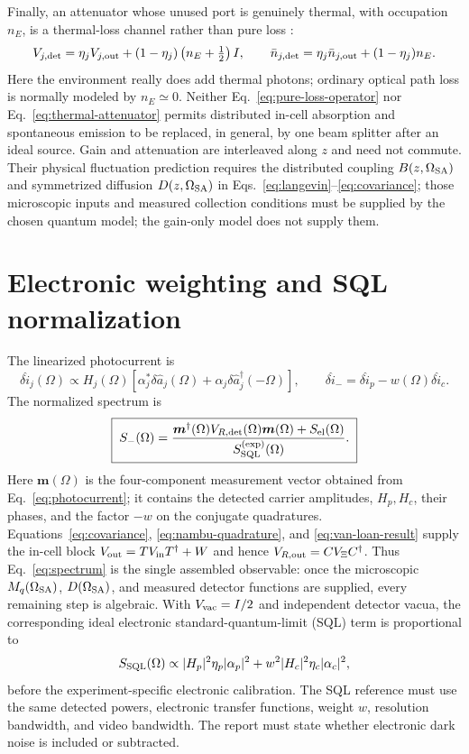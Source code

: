 \documentclass[11pt,a4paper]{article}
\begin{document}
Finally, an attenuator whose unused port is genuinely thermal, with occupation
$n_E$, is a thermal-loss channel rather than pure loss \cite{Lami2020,Xiang2017}:
\begin{equation}
 V_{j,{\rm det}}=\eta_j V_{j,{\rm out}}
 +(1-\eta_j)\left(n_E+\tfrac12\right)I,
 \qquad
 \bar n_{j,{\rm det}}=\eta_j\bar n_{j,{\rm out}}+(1-\eta_j)n_E .
 \label{eq:thermal-attenuator}
\end{equation}
Here the environment really does add thermal photons; ordinary optical path
loss is normally modeled by $n_E\simeq0$.  Neither Eq.~\eqref{eq:pure-loss-operator}
nor Eq.~\eqref{eq:thermal-attenuator} permits distributed in-cell absorption and
spontaneous emission to be replaced, in general, by one beam splitter after an
ideal source.  Gain and attenuation are interleaved along $z$ and need not
commute.  Their physical fluctuation prediction requires the distributed
coupling $B(z,\Omega_{\rm SA})$ and symmetrized diffusion
$D(z,\Omega_{\rm SA})$ in Eqs.~\eqref{eq:langevin}--\eqref{eq:covariance}; those
microscopic inputs and measured collection conditions must be supplied by the chosen quantum model; the gain-only model does not supply them.

\section{Electronic weighting and SQL normalization}

The linearized photocurrent is
\begin{equation}
\delta\hat i_j(\Omega)\propto H_j(\Omega)
\left[\alpha_j^*\delta\hat a_j(\Omega)
+\alpha_j\delta\hat a_j^\dagger(-\Omega)\right],
\qquad
\delta\hat i_-=\delta\hat i_p-w(\Omega)\delta\hat i_c .
\label{eq:photocurrent}
\end{equation}
The normalized spectrum is
\begin{equation}
\boxed{\;
S_-(\Omega)=
\frac{\bm m^\dagger(\Omega)V_{R,\rm det}(\Omega)\bm m(\Omega)
+S_{\rm el}(\Omega)}
{S_{\rm SQL}^{(\rm exp)}(\Omega)} .\;}
\label{eq:spectrum}
\end{equation}
Here $\bm m(\Omega)$ is the four-component measurement vector obtained from
Eq.~\eqref{eq:photocurrent}; it contains the detected carrier amplitudes,
$H_p,H_c$, their phases, and the factor $-w$ on the conjugate quadratures.
Equations~\eqref{eq:covariance}, \eqref{eq:nambu-quadrature}, and
\eqref{eq:van-loan-result} supply the in-cell block
$V_{\rm out}=T V_{\rm in}T^\dagger+W$ and hence
$V_{R,\rm out}=CV_\Xi C^\dagger$. Thus Eq.~\eqref{eq:spectrum} is the single
assembled observable: once the microscopic
$M_q(\Omega_{\rm SA})$, $D(\Omega_{\rm SA})$, and measured detector functions
are supplied, every remaining step is algebraic.
With $V_{\rm vac}=I/2$ and independent detector vacua, the corresponding
ideal electronic standard-quantum-limit (SQL) term is proportional to
\[
S_{\rm SQL}(\Omega)\propto
|H_p|^2\eta_p|\alpha_p|^2+
w^2|H_c|^2\eta_c|\alpha_c|^2 ,
\]
before the experiment-specific electronic calibration.
The SQL reference must use the same detected powers, electronic
transfer functions, weight $w$, resolution bandwidth, and video bandwidth.
The report must state whether electronic dark noise is included or subtracted.
\end{document}
